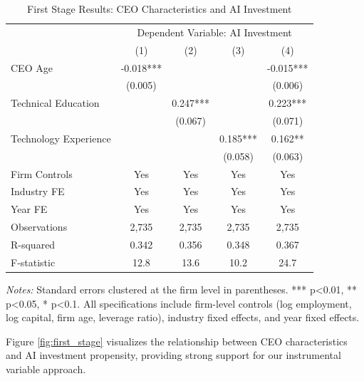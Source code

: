 \documentclass[12pt]{article}
\begin{document}
\begin{table}[H]
\centering
\caption{First Stage Results: CEO Characteristics and AI Investment}
\label{tab:first_stage}
\begin{tabular}{lcccc}
\toprule
 & \multicolumn{4}{c}{Dependent Variable: AI Investment} \\
 & (1) & (2) & (3) & (4) \\
\midrule
CEO Age & -0.018*** & & & -0.015*** \\
 & (0.005) & & & (0.006) \\
Technical Education & & 0.247*** & & 0.223*** \\
 & & (0.067) & & (0.071) \\
Technology Experience & & & 0.185*** & 0.162** \\
 & & & (0.058) & (0.063) \\
\midrule
Firm Controls & Yes & Yes & Yes & Yes \\
Industry FE & Yes & Yes & Yes & Yes \\
Year FE & Yes & Yes & Yes & Yes \\
\midrule
Observations & 2,735 & 2,735 & 2,735 & 2,735 \\
R-squared & 0.342 & 0.356 & 0.348 & 0.367 \\
F-statistic & 12.8 & 13.6 & 10.2 & 24.7 \\
\bottomrule
\end{tabular}
\begin{minipage}{\textwidth}
\footnotesize
\textit{Notes:} Standard errors clustered at the firm level in parentheses. *** p<0.01, ** p<0.05, * p<0.1. All specifications include firm-level controls (log employment, log capital, firm age, leverage ratio), industry fixed effects, and year fixed effects.
\end{minipage}
\end{table}

Figure \ref{fig:first_stage} visualizes the relationship between CEO characteristics and AI investment propensity, providing strong support for our instrumental variable approach.
\end{document}
